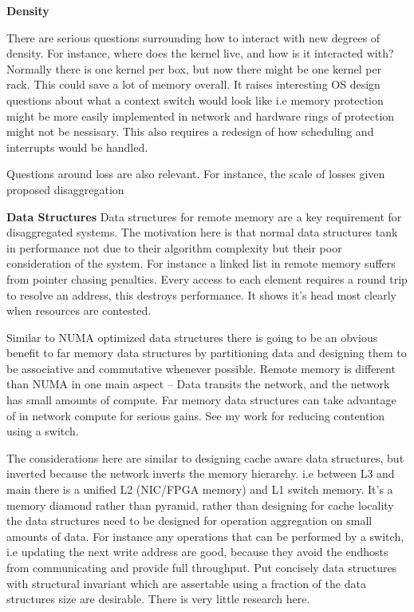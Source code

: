 \textbf{Density}

There are serious questions surrounding how to interact with new degrees of
density. For instance, where does the kernel live, and how is it interacted
with? Normally there is one kernel per box, but now there might be one kernel
per rack. This could save a lot of memory overall. It raises interesting OS
design questions about what a context switch would look like i.e memory
protection might be more easily implemented in network and hardware rings of
protection might not be nessisary. This also requires a redesign of how
scheduling and interrupts would be handled.

Questions around loss are also relevant. For instance, the scale of losses given
proposed disaggregation 


\textbf{Data Structures} Data structures for remote memory are a key requirement
for disaggregated systems. The motivation here is that normal data structures
tank in performance not due to their algorithm complexity but their poor
consideration of the system. For instance a linked list in remote memory suffers
from pointer chasing penalties. Every access to each element requires a round
trip to resolve an address, this destroys performance. It shows it's head most
clearly when resources are contested.

Similar to NUMA optimized data structures there is going to be an obvious
benefit to far memory data structures by partitioning data and designing them to
be associative and commutative whenever possible. Remote memory is different than
NUMA in one main aspect -- Data transits the network, and the network has small
amounts of compute. Far memory data structures can take advantage of in network
compute for serious gains. See my work for reducing contention using a switch.

The considerations here are similar to designing cache aware data structures,
but inverted because the network inverts the memory hierarchy. i.e between L3 and
main there is a unified L2 (NIC/FPGA memory) and L1 switch memory. It's a memory
diamond rather than pyramid, rather than designing for cache locality the data
structures need to be designed for operation aggregation on small amounts of
data. For instance any operations that can be performed by a switch, i.e
updating the next write address are good, because they avoid the endhosts from
communicating and provide full throughput. Put concisely data structures with
structural invariant which are assertable using a fraction of the data
structures size are desirable. There is very little research here.


